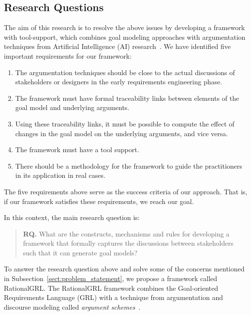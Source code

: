 \subsection{Research Questions}
 
The aim of this research is to resolve the above issues by developing a framework with tool-support, which combines goal modeling approaches with argumentation techniques from Artificial Intelligence (AI) research~\cite{atkinson2007}. We have identified five important requirements for our framework: 
\begin{enumerate}
\item The argumentation techniques should be close to the actual discussions of stakeholders or designers in the early requirements engineering phase.
\item 
The framework must have formal traceability links between elements of the goal model and underlying arguments.
\item 
Using these traceability links, it must be possible to compute the effect of changes in the goal model on the underlying arguments, and vice versa.
\item 
The framework must have a tool support.
\item 
There should be a methodology for the framework to guide the practitioners in its application in real cases.
\end{enumerate}

The five requirements above serve as the success criteria of our approach. That is, if our framework satisfies these requirements, we reach our goal. 

In this context, the main research question is: 

\begin{quote}
\textbf{RQ.} What are the constructs, mechanisms and rules for developing a framework that formally captures the discussions between stakeholders such that it can generate goal models?
\end{quote}

To answer the research question above and solve some of the concerns mentioned in Subsection~\ref{sect:problem_statement}, we propose a framework called RationalGRL. The RationalGRL framework combines the Goal-oriented Requirements Language (GRL) with a technique from argumentation and discourse modeling called \emph{argument schemes}~\cite{walton-etal2004}. 

